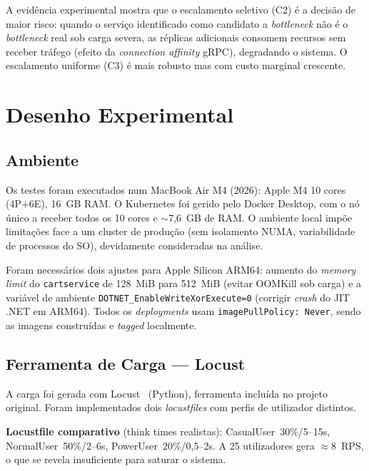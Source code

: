 \documentclass[manuscript,screen,review]{acmart}
\begin{document}
A evidência experimental mostra que o escalamento seletivo (C2) é a decisão de maior risco: quando o serviço identificado como candidato a \textit{bottleneck} não é o \textit{bottleneck} real sob carga severa, as réplicas adicionais consomem recursos sem receber tráfego (efeito da \textit{connection affinity} gRPC), degradando o sistema. O escalamento uniforme (C3) é mais robusto mas com custo marginal crescente.


\section{Desenho Experimental}
\label{sec:metodologia}

\subsection{Ambiente}

Os testes foram executados num MacBook Air M4 (2026): Apple M4 10 cores (4P+6E), 16~GB RAM. O Kubernetes foi gerido pelo Docker Desktop, com o nó único a receber todos os 10 cores e $\sim$7,6~GB de RAM. O ambiente local impõe limitações face a um cluster de produção (sem isolamento NUMA, variabilidade de processos do SO), devidamente consideradas na análise.

Foram necessários dois ajustes para Apple Silicon ARM64: aumento do \textit{memory limit} do \texttt{cartservice} de 128~MiB para 512~MiB (evitar OOMKill sob carga) e a variável de ambiente \texttt{DOTNET\_EnableWriteXorExecute=0} (corrigir \textit{crash} do JIT .NET em ARM64). Todos os \textit{deployments} usam \texttt{imagePullPolicy: Never}, sendo as imagens construídas e \textit{tagged} localmente.

\subsection{Ferramenta de Carga — Locust}

A carga foi gerada com Locust~\cite{locust} (Python), ferramenta incluída no projeto original. Foram implementados dois \textit{locustfiles} com perfis de utilizador distintos.

\textbf{Locustfile comparativo} (think times realistas): CasualUser~30\%/5--15s, NormalUser~50\%/2--6s, PowerUser~20\%/0,5--2s. A 25 utilizadores gera $\approx$8~RPS, o que se revela insuficiente para saturar o sistema.
\end{document}
